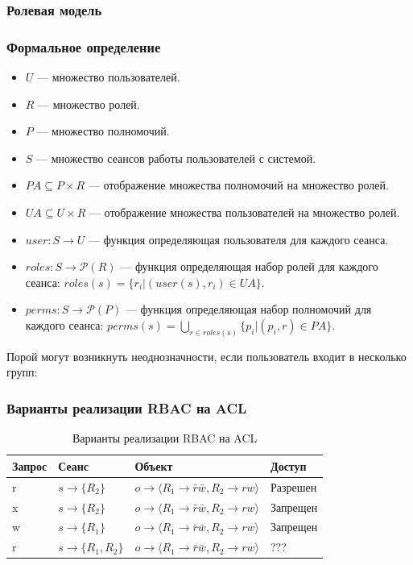 \begin{frame}
    \frametitle{Ролевая модель}
    \frametitle{Формальное определение}
    
    \begin{itemize}
        \item $U$ --- множество пользователей.
        \item $R$ --- множество ролей.
        \item $P$ --- множество полномочий.
        \item $S$ --- множество сеансов работы пользователей с системой.
        \item $PA\subseteq P\times R$ --- отображение множества полномочий на множество ролей. 
        \item $UA\subseteq U\times R$ --- отображение множества пользователей на множество ролей. 
        \item $user:S\to U$ --- функция определяющая пользователя для каждого сеанса.
        \item $roles:S\to \mathcal{P}(R)$ --- функция определяющая набор ролей для каждого сеанса: $roles(s)=\{r_i|(user(s),r_i)\in UA\}$.
        \item $perms:S\to \mathcal{P}(P)$ --- функция определяющая набор полномочий для каждого сеанса: $perms(s)=\bigcup_{r\in roles(s)} \{p_i|(p_i,r)\in PA\}$.
    \end{itemize}
\end{frame}


Порой могут возникнуть неоднозначности, если пользователь входит в несколько групп:

\begin{frame}
    \frametitle{Варианты реализации RBAC на ACL}
    \begin{table}[ht]
        \caption{Варианты реализации RBAC на ACL}\label{t:rbacOnAcl}
        \centering
        \begin{tabular}[c]{|l|l|l|l|}
            \hline\hline
            Запрос & Сеанс              & Объект                                               & Доступ   \\
            \hline\hline
            r      & $s\to\{R_2\}$      & $o\to\langle R_1\to\bar{r}\bar{w},R_2\to rw \rangle$ & Разрешен \\ 
            \hline
            x      & $s\to\{R_2\}$      & $o\to\langle R_1\to\bar{r}\bar{w},R_2\to rw \rangle$ & Запрещен \\ 
            \hline
            w      & $s\to\{R_1\}$      & $o\to\langle R_1\to\bar{r}\bar{w},R_2\to rw \rangle$ & Запрещен \\ 
            \hline
            r      & $s\to\{R_1,R_2\}$  & $o\to\langle R_1\to\bar{r}\bar{w},R_2\to rw \rangle$ & ???      \\ 
            \hline
        \end{tabular}
    \end{table}
\end{frame}


